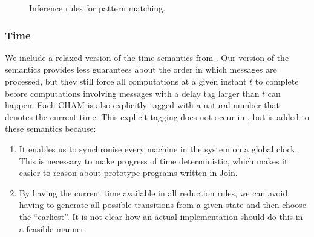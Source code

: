 \begin{figure}[!h]
\caption{Inference rules for pattern matching.} \label{fig:rule:pat}
\end{figure}

\subsubsection{Time}
We include a relaxed version of the time semantics from \cite{timed-join}. Our
version of the semantics provides less guarantees about the order in which
messages are processed, but they still force all computations at a given instant
$t$ to complete before computations involving messages with a delay tag larger
than $t$ can happen. Each CHAM is also explicitly tagged with a natural number
that denotes the current time. This explicit tagging does not occur in
\cite{timed-join}, but is added to these semantics because:
\begin{enumerate}
 \item It enables us to synchronise every machine in the system on a global
 clock. This is necessary to make progress of time deterministic, which makes
 it easier to reason about prototype programs written in Join.
 \item By having the current time available in all reduction rules, we can
 avoid having to generate all possible transitions from a given state and then
 choose the ``earliest''. It is not clear how an actual implementation should
 do this in a feasible manner.
\end{enumerate}

